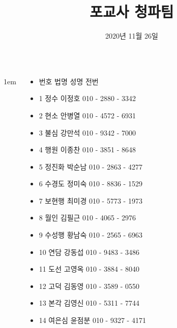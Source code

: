 \documentclass[	25pt, 
							a0paper, 
							portrait, %
							margin=0mm, %
							innermargin=10mm,  		%
							blockverticalspace=4mm, %
							colspace=5mm, 
							subcolspace=0mm
							]{tikzposter}
\title{ 포교사 청파팀  }
\author{ 2020년 11월 26일  }
\begin{document}
	\maketitle[
					width=841mm,
					linewidth = 2mm,
					innersep=4mm,
					titletextscale =4, 
				]




	\begin{columns}



			{
					\setlength{\leftmargini}{2em}
					\setlength{\labelsep} {1em}
				\begin{LARGE}
					\begin{itemize}
					\item 번호 	법명	성명	전번
					\item 1	정수	이정호	010 - 2880 - 3342
					\item 2	현소	안병열	010 - 4572 - 6931
					\item 3	불심	강만석	010 - 9342 - 7000
					\item 4	행원	이종찬	010 - 3851 - 8648
					\item 5	정진화	박순남	010 - 2863 - 4277
					\item 6	수경도	정미숙	010 - 8836 - 1529
					\item 7	보현행	최미경	010 - 5773 - 1973
					\item 8	월인	김필근	010 - 4065 - 2976
					\item 9	수성행	황남숙	010 - 2565 - 6963
					\item 10	연담	강동섭	010 - 9483 - 3486
					\item 11	도선	고영옥	010 - 3884 - 8040
					\item 12	고덕	김동영	010 - 3589 - 0550
					\item 13	본각	김영신	010 - 5311 - 7744
					\item 14	여은심	윤점분	010 - 9327 - 4171

\end{itemize}
\end{LARGE}}
\end{columns}
\end{document}
